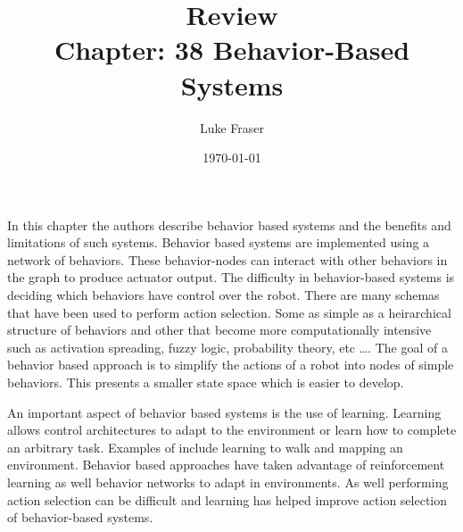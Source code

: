\documentclass{article}
\begin{document}
\title{{\large Review} \\ Chapter: 38 Behavior-Based Systems}
\author{Luke Fraser}
\date{\today}
\maketitle

\begingroup
\renewcommand{\section}[2]{}


\endgroup

\section*{Summary}
In this chapter the authors describe behavior based systems and the benefits and limitations of such systems. Behavior based systems are implemented using a network of behaviors. These behavior-nodes can interact with other behaviors in the graph to produce actuator output. The difficulty in behavior-based systems is deciding which behaviors have control over the robot. There are many schemas that have been used to perform action selection. Some as simple as a heirarchical structure of behaviors and other that become more computationally intensive such as activation spreading, fuzzy logic, probability theory, etc \ldots. The goal of a behavior based approach is to simplify the actions of a robot into nodes of simple behaviors. This presents a smaller state space which is easier to develop.

An important aspect of behavior based systems is the use of learning. Learning allows control architectures to adapt to the environment or learn how to complete an arbitrary task. Examples of include learning to walk and mapping an environment. Behavior based approaches have taken advantage of reinforcement learning as well behavior networks to adapt in environments. As well performing action selection can be difficult and learning has helped improve action selection of behavior-based systems.
\end{document}
